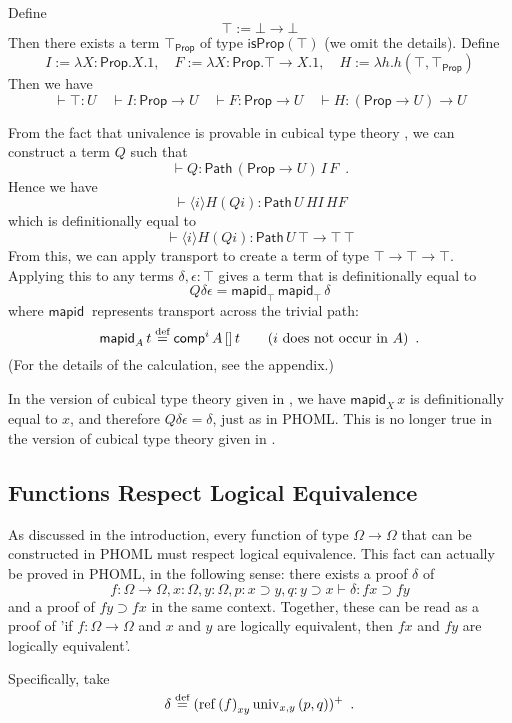 \documentclass[a4paper,UKenglish]{lipics-v2016}
\newcommand*{\eqdef}{\mathrel{\smash{\stackrel{\text{def}}{=}}}}
\newcommand*{\reff}[1]{\ensuremath{\mathrm{ref} \left( {#1} \right)}}
\newcommand*{\univ}[4]{\ensuremath{\mathrm{univ}_{{#1}, {#2}} \left({#3} , {#4} \right)}}
\newcommand{\Path}[3]{\ensuremath{\mathsf{Path} \, {#1} \, {#2} \, {#3}}}
\newcommand{\Prop}{\mathsf{Prop}}
\newcommand{\isProp}[1]{\mathsf{isProp} \left( {#1} \right)}
\newcommand{\mapid}[2]{\mathsf{mapid}_{#1} \, {#2}}
\newcommand{\comp}{\mathsf{comp}}
\theoremstyle{plain}
\theoremstyle{definition}
\begin{document}
Define
\[ \top := \bot \rightarrow \bot \]
Then there exists a term $\top_\Prop$ of type $\isProp{\top}$ (we omit the details).  Define
\[ I := \lambda X:\Prop.X.1, \quad F := \lambda X : \Prop.\top \rightarrow X.1, \quad H := \lambda h.h (\top , \top_\Prop) \]
Then we have
\[ \vdash \top : U \quad
\vdash I  : \Prop \rightarrow U \quad
\vdash F  : \Prop \rightarrow U \quad
\vdash H  : (\Prop \rightarrow U) \rightarrow U \]

From the fact that univalence is provable in cubical type theory \cite{cchm:cubical}, we can construct a term $Q$ such that
\[ \vdash Q : \Path{(\Prop \rightarrow U)}{I}{F} \enspace . \]
Hence we have
\[ \vdash \langle i \rangle H (Q i) : \Path{U}{HI}{HF} \]
which is definitionally equal to
\[ \vdash \langle i \rangle H (Q i) : \Path{U}{\top \rightarrow \top}{\top} \]
From this, we can apply transport to create a term of type $\top \rightarrow \top \rightarrow \top$.  Applying this to any terms $\delta, \epsilon : \top$ gives a term that
is definitionally equal to
\[ Q \delta \epsilon = \mapid{\top}{\mapid{\top}{\delta}} \]
where $\mapid{}{}$ represents transport across the trivial path:
\[ \mapid{A}{t} \eqdef \comp^i \, A \, [] \, t \qquad (i \text{ does not occur in } A) \enspace . \]
(For the details of the calculation, see the appendix.)

In the version of cubical type theory given in \cite{bch:cubical}, we have $\mapid{X}{x}$ is definitionally equal to $x$, and therefore $Q \delta \epsilon = \delta$, just as in PHOML.
This is no longer true in the version of cubical type theory given in \cite{cchm:cubical}.

\subsection{Functions Respect Logical Equivalence}
\label{section:exampletwo}

As discussed in the introduction, every function of type $\Omega \rightarrow \Omega$ that can be constructed in PHOML must respect logical equivalence.  This fact can actually be proved in PHOML,
in the following sense: there exists a proof $\delta$ of
\[ f : \Omega \rightarrow \Omega, x : \Omega, y : \Omega, p : x \supset y, q : y \supset x \vdash \delta : f x \supset f y \]
and a proof of $f y \supset f x$ in the same context.  Together, these can be read as a proof of 'if $f : \Omega \rightarrow \Omega$ and $x$ and $y$ are logically equivalent, then $fx$ and $fy$ are logically equivalent'.

Specifically, take
\[ \delta \eqdef (\reff{f}_{xy} \univ{x}{y}{p}{q})^+ \enspace . \]
\end{document}

